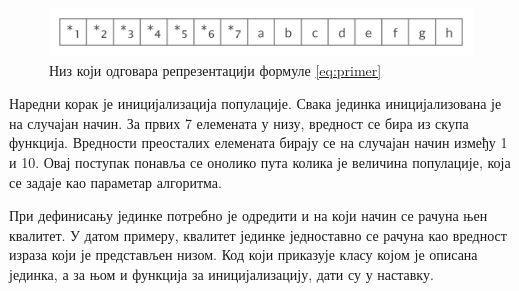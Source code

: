 \documentclass[a4paper]{article}
\begin{document}
\begin{figure}[ht!]
    \begin{center}
    \includegraphics[scale=0.14]{niz_primera.png}
    \end{center}
    \caption{Низ који одговара репрезентацији формуле \eqref{eq:primer}}
    \label{fig:niz}
\end{figure}
\bigskip

Наредни корак је иницијализација популације. Свака јединка иницијализована је на случајан начин. За првих 7 елемената у низу, вредност се бира из скупа функција. Вредности преосталих елемената бирају се на случајан начин између 1 и 10. Овај поступак понавља се онолико пута колика је величина популације, која се задаје као параметар алгоритма. \newline

При дефинисању јединке потребно је одредити и на који начин се рачуна њен квалитет. У датом примеру, квалитет јединке једноставно се рачуна као вредност израза који је представљен низом. Код који приказује класу којом је описана јединка, а за њом и функција за иницијализацију, дати су у наставку. \newline
\end{document}
